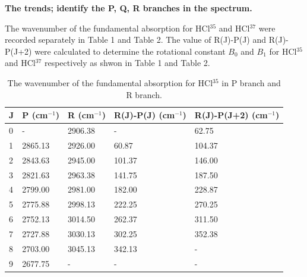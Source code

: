 \documentclass[twocolumn]{article} %
\begin{document}
\textbf{The trends; identify the P, Q, R branches in the spectrum. }

The wavenumber of the fundamental absorption for HCl$^{35}$ and HCl$^{37}$ were recorded separately in Table 1 and Table 2. The value of R(J)-P(J) and R(J)-P(J+2) were calculated to determine the rotational constant $B_0$ and $B_1$ for HCl$^{35}$ and HCl$^{37}$ respectively as shwon in Table 1 and Table 2.

\begin{table}[h]
    \caption{The wavenumber of the fundamental absorption for HCl$^{35}$ in P branch and R branch.}
    \begin{tabular}{L{.1in}C{.7in}C{.7in}C{.7in}C{.8in}}\toprule
        J & P (cm$^{-1}$)      & R     (cm$^{-1}$)  & R(J)-P(J) (cm$^{-1}$)& R(J)-P(J+2) (cm$^{-1}$)\\ &     -   & 2906.38 &     -     & 62.75       \\
        1 & 2865.13 & 2926.00 & 60.87     & 104.37      \\
        2 & 2843.63 & 2945.00 & 101.37    & 146.00      \\
        3 & 2821.63 & 2963.38 & 141.75    & 187.50      \\
        4 & 2799.00 & 2981.00 & 182.00    & 228.87      \\
        5 & 2775.88 & 2998.13 & 222.25    & 270.25      \\
        6 & 2752.13 & 3014.50 & 262.37    & 311.50      \\
        7 & 2727.88 & 3030.13 & 302.25    & 352.38      \\
        8 & 2703.00 & 3045.13 & 342.13    &   -          \\
        9 & 2677.75 &     -   &    -      &    - \\\bottomrule
   \end{tabular}
\end{table}
\end{document}
